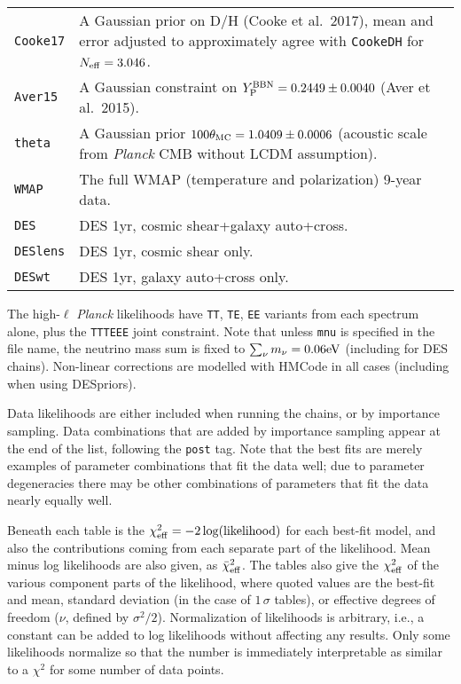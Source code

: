 \begin{tabular} { l   l  }
{\tt Cooke17}        & A Gaussian prior on D/H (Cooke et al.\ 2017), mean and error adjusted to approximately agree with {\tt CookeDH} for $N_{\rm eff}=3.046$. \\
{\tt Aver15}         & A Gaussian constraint on $Y_{\rm P}^{\rm BBN}=0.2449\pm 0.0040$ (Aver et al.\ 2015). \\
{\tt theta}          & A Gaussian prior $100\theta_{\rm MC}=1.0409\pm 0.0006$ (acoustic scale from \textit{Planck} CMB without LCDM assumption). \\
{\tt WMAP}           & The full WMAP (temperature and polarization) 9-year data. \\
{\tt DES}            & DES 1yr, cosmic shear+galaxy auto+cross. \\
{\tt DESlens}        & DES 1yr, cosmic shear only. \\
{\tt DESwt}          & DES 1yr, galaxy auto+cross only. \\
\hline
\end{tabular}
\vskip 1cm
The high-$\ell$ \textit{Planck} likelihoods have {\tt TT}, {\tt TE}, {\tt EE} variants from each spectrum alone, plus the {\tt TTTEEE} joint constraint.
Note that unless {\tt mnu} is specified in the file name, the neutrino mass sum is fixed to $\sum_\nu m_\nu = 0.06 {\rm eV}$ (including for DES chains). Non-linear corrections are
modelled with HMCode in all cases (including when using DESpriors).

Data likelihoods are either included when running the chains, or by importance sampling. Data combinations that are added by importance sampling appear
at the end of the list, following the {\tt post{\textunderscore}} tag. Note that the best fits are merely examples of parameter combinations that fit the data well; due to parameter degeneracies there may be other combinations of parameters that fit the data nearly equally well.

Beneath each table is the $\chi^2_{\rm eff}=-2\log({\rm likelihood})$ for each best-fit model, and also the contributions coming from each separate part of the likelihood. Mean minus log likelihoods are also given, as $\bar{\chi}^2_{\rm eff}$.
The tables also give the $\chi^2_{\rm eff}$ of the various component parts of the likelihood, where quoted values are the best-fit and mean, standard deviation (in the case of $1\,\sigma$ tables), or effective degrees of freedom ($\nu$, defined by $\sigma^2/2$). Normalization of likelihoods is arbitrary, i.e., a constant can be added to log likelihoods without affecting any results. Only some likelihoods normalize so that the number is immediately interpretable as similar to a $\chi^2$ for some number of data points.

